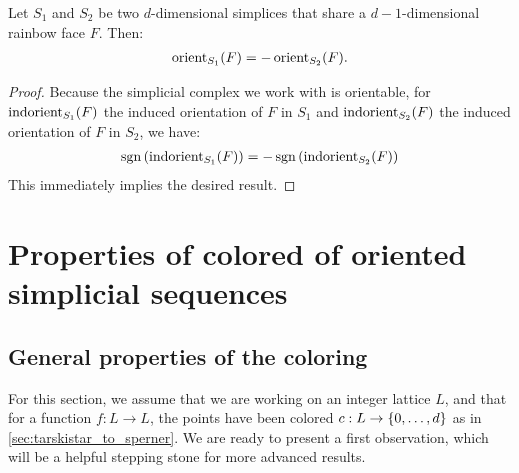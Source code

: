 \begin{lemma}
	\label{lem:soundness_of_colored_orientability}
	Let $S_1$ and $S_2$ be two $d$-dimensional simplices that share a $d-1$-dimensional rainbow face $F$. Then:
	\begin{align*}
		\operatorname{orient}_{S_1}(F) = - \operatorname{orient}_{S_2}(F).
	\end{align*}
\end{lemma}
\begin{proof}
	Because the simplicial complex we work with is orientable, for $\operatorname{indorient}_{S_1}(F)$ the induced orientation of $F$ in $S_1$ and $\operatorname{indorient}_{S_2}(F)$ the induced orientation of $F$ in $S_2$, we have:
	\begin{align*}
		\operatorname{sgn}\left(\operatorname{indorient}_{S_1}(F)\right) = - \operatorname{sgn}\left(\operatorname{indorient}_{S_2}(F)\right)
	\end{align*}
	This immediately implies the desired result.
\end{proof}

\section{Properties of colored of oriented simplicial sequences}

\subsection{General properties of the coloring}

For this section, we assume that we are working on an integer lattice $L$, and that for a function $f: L \rightarrow L$, the points have been colored $c : L \rightarrow \left\{0, \dots, d\right\}$ as in \cref{sec:tarskistar_to_sperner}. We are ready to present a first observation, which will be a helpful stepping stone for more advanced results.

